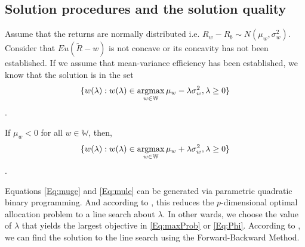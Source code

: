 			\subsection{Solution procedures and the solution quality} \label{sec:sol_to_mean_var}
				\begin{prop+}\cite{morton2003optimizing}
					Assume that the returns are normally distributed i.e. $R_w-R_b \sim N(\mu_w,\sigma_w^2)$. Consider that $Eu(\tilde{R}-w)$ is not concave or its concavity has not been established. If we assume that mean-variance efficiency has been established, we know that the solution is in the set
					\begin{equation}\label{Eq:muge}
						\{ w(\lambda):w(\lambda) \in \operatorname*{argmax}_{w\in \mathbb{W}} \mu_w - \lambda\sigma_w^2, \lambda \ge0 \}
					\end{equation}.

					If $\mu_w <0$ for all $w\in \mathbb{W}$, then,
					\begin{equation}\label{Eq:mule}
						\{ w(\lambda):w(\lambda) \in \operatorname*{argmax}_{w\in \mathbb{W}} \mu_w + \lambda\sigma_w^2, \lambda \ge0 \}
					\end{equation}.
				\end{prop+}

				Equations \eqref{Eq:muge} and \eqref{Eq:mule} can be generated via parametric quadratic binary programming. And according to \cite{morton2003optimizing}, this reduces the $p$-dimensional optimal allocation problem to a line search about $\lambda$. In other wards, we choose the value of $\lambda$ that yields the largest objective in \eqref{Eq:maxProb} or \eqref{Eq:Phi}. According to \cite{sun2006optimization}, we can find the solution to the line search using the Forward-Backward Method.




